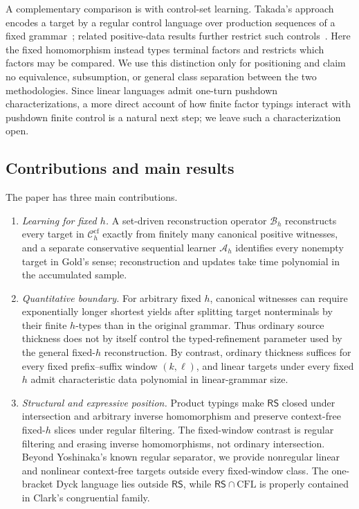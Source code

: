 \documentclass[11pt,a4paper]{article}
\theoremstyle{remark}
\theoremstyle{plain}
\newcommand{\cf}{\mathrm{cf}}
\newcommand{\Ccf}[1]{\mathcal C_{#1}^{\cf}}
\begin{document}
A complementary comparison is with control-set learning.  Takada's approach
encodes a target by a regular control language over production sequences of a
fixed grammar~\cite{takada1988,takada1995}; related positive-data results
further restrict such controls~\cite{koshiba-makinen-takada1997}.  Here the
fixed homomorphism instead types terminal factors and restricts which factors
may be compared.  We use this distinction only for positioning and claim no
equivalence, subsumption, or general class separation between the two
methodologies.  Since linear languages admit one-turn pushdown
characterizations, a more direct account of how finite factor typings interact
with pushdown finite control is a natural next step; we leave such a
characterization open.

\subsection{Contributions and main results}

The paper has three main contributions.

\begin{enumerate}[label=\textup{(\arabic*)},leftmargin=2.4em]
\item \emph{Learning for fixed $h$.}  A set-driven reconstruction operator
$\mathcal B_h$ reconstructs every target in $\Ccf{h}$ exactly from finitely
many canonical positive witnesses, and a separate conservative sequential
learner $\mathcal A_h$ identifies every nonempty target in Gold's sense;
reconstruction and updates take time polynomial in the accumulated sample.

\item \emph{Quantitative boundary.}  For arbitrary fixed $h$, canonical
witnesses can require exponentially longer shortest yields after splitting
target nonterminals by their finite $h$-types than in the original grammar.
Thus ordinary source thickness does not by itself control the typed-refinement
parameter used by the general fixed-$h$ reconstruction.  By contrast, ordinary
thickness suffices for every fixed prefix--suffix window $(k,\ell)$, and linear targets
under every fixed $h$ admit characteristic data polynomial in linear-grammar
size.

\item \emph{Structural and expressive position.}  Product typings make
$\mathsf{RS}$ closed under intersection and arbitrary inverse homomorphism
and preserve context-free fixed-$h$ slices under regular filtering.  The
fixed-window contrast is regular filtering and erasing inverse homomorphisms,
not ordinary intersection.  Beyond Yoshinaka's known regular separator, we
provide nonregular linear and nonlinear context-free targets outside every
fixed-window class.  The one-bracket Dyck language lies outside $\mathsf{RS}$,
while $\mathsf{RS}\cap\mathrm{CFL}$ is properly contained in Clark's
congruential family.
\end{enumerate}
\end{document}
